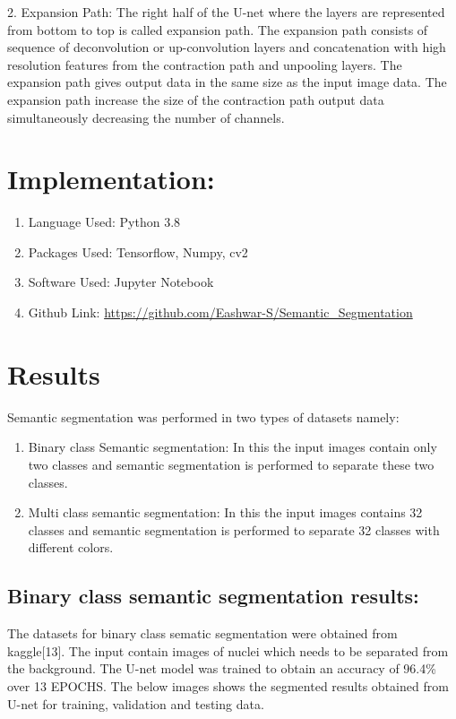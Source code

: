 \documentclass{IEEEtran}
\begin{document}
2. Expansion Path: The right half of the U-net where the layers are represented from bottom to top is called expansion path. The expansion path consists of sequence of deconvolution or up-convolution layers and concatenation with high resolution features from the contraction path and unpooling layers. The expansion path gives output data in the same size as the input image data. The expansion path increase the size of the contraction path output data simultaneously decreasing the number of channels.

\section{\textbf{Implementation:}}
\begin{enumerate}
\item Language Used: Python 3.8

\item Packages Used: Tensorflow, Numpy, cv2

\item Software Used: Jupyter Notebook

\item Github Link: \url{https://github.com/Eashwar-S/Semantic_Segmentation}

\end{enumerate}

\section{\textbf{Results}}
Semantic segmentation was performed in two types of datasets namely:
\begin{enumerate}
\item Binary class Semantic segmentation: In this the input images contain only two classes and semantic segmentation is performed to separate these two classes.

\item Multi class semantic segmentation: In this the input images contains 32 classes and semantic segmentation is performed to separate 32 classes with different colors.
\end{enumerate}

\subsection{\textbf{Binary class semantic segmentation results:}}
The datasets for binary class sematic segmentation were obtained from kaggle[13]. The input contain images of nuclei which needs to be separated from the background. The U-net model was trained to obtain an accuracy of 96.4\% over 13 EPOCHS. The below images shows the segmented results obtained from U-net for training, validation and testing data.
\end{document}
